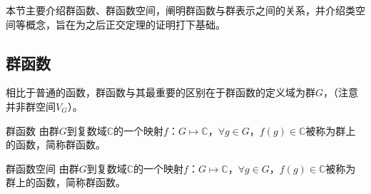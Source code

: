 
\begin{issues}
\issueDraft
\issueTODO
\end{issues}

本节主要介绍群函数、群函数空间，阐明群函数与群表示之间的关系，并介绍类空间等概念，旨在为之后正交定理的证明打下基础。

\subsection{群函数}

相比于普通的函数，群函数与其最重要的区别在于群函数的定义域为群$G$，（注意并非群空间$V_G$）。
\begin{definition}{群函数}
由群$G$到复数域$\mathbb{C}$的一个映射$f$：$G\longmapsto \mathbb{C}$，$\forall g\in G$，$f(g)\in \mathbb{C}$被称为群上的函数，简称群函数。
\end{definition}

\begin{definition}{群函数空间}
由群$G$到复数域$\mathbb{C}$的一个映射$f$：$G\longmapsto \mathbb{C}$，$\forall g\in G$，$f(g)\in \mathbb{C}$被称为群上的函数，简称群函数。
\end{definition}